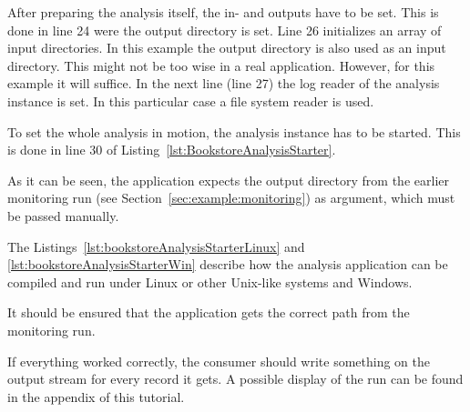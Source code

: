 After preparing the analysis itself, the in- and outputs have to be set. This is done in line 24 were the output directory is set. Line 26 initializes an array of input directories. In this example the output directory is also used as an input directory. This might not be too wise in a real application. However, for this example it will suffice. In the next line (line 27) the log reader of the analysis instance is set. In this particular case a file system reader is used.

To set the whole analysis in motion, the analysis instance has to be started. This is done in line 30 of Listing~\ref{lst:BookstoreAnalysisStarter}.

As it can be seen, the application expects the output directory from the earlier monitoring run (see Section~\ref{sec:example:monitoring}) as argument, which must be passed manually. 

The Listings~\ref{lst:bookstoreAnalysisStarterLinux} and \ref{lst:bookstoreAnalysisStarterWin} describe how the analysis application can be compiled and run under Linux or other Unix-like systems and Windows.

\setBashListing 		

	
	

It should be ensured that the application gets the correct path from the monitoring run. 

If everything worked correctly, the consumer should write something on the output stream for every record it gets. A possible display of the run can be found in the appendix of this tutorial. 
